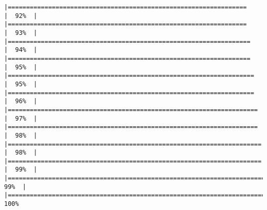 \documentclass[
]{article}
\begin{document}
\begin{verbatim}
|=================================================================     |  92%  |                                                                              |=================================================================     |  93%  |                                                                              |==================================================================    |  94%  |                                                                              |==================================================================    |  95%  |                                                                              |===================================================================   |  95%  |                                                                              |===================================================================   |  96%  |                                                                              |====================================================================  |  97%  |                                                                              |====================================================================  |  98%  |                                                                              |===================================================================== |  98%  |                                                                              |===================================================================== |  99%  |                                                                              |======================================================================|  99%  |                                                                              |======================================================================| 100%
\end{verbatim}
\end{document}
